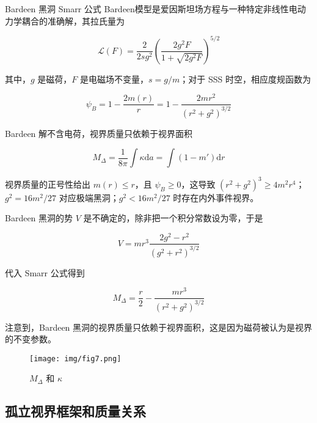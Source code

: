 \documentclass[9pt, dvipsnames]{beamer} %
\begin{document}
\begin{frame}{Bardeen 黑洞 Smarr 公式}
    Bardeen模型是爱因斯坦场方程与一种特定非线性电动力学耦合的准确解，其拉氏量为

    $$
    \mathcal{L}(F)
    =\frac{2 }{2 sg^2 } \left(\frac{2g^2 F }{1+\sqrt{2g^2 F} }  \right)^{5/2}
    $$

    其中，$g$ 是磁荷，$F$ 是电磁场不变量，$s=g/m$；对于 SSS 时空，相应度规函数为

    $$
    \psi_B
    =1-\frac{2 m(r) }{r } 
    =1-\frac{2mr^2 }{\left(r^2+g^2 \right)^{3/2} }
    $$

    Bardeen 解不含电荷，视界质量只依赖于视界面积

    $$
    M_\Delta
    =\frac{1 }{8\pi } \int\kappa \mathrm{d}a
    =\int \left(1-m' \right)\mathrm{d}r
    $$

    视界质量的正号性给出 $m(r)\leqslant r$，且 $\psi_B\geqslant 0$，这导致 $(r^2+g^2)^3\geqslant 4m^2 r^4$；$g^2=16m^2/27$ 对应极端黑洞；$g^2<16m^2/27$ 时存在内外事件视界。
\end{frame}

\begin{frame}
    Bardeen 黑洞的势 $V$ 是不确定的，除非把一个积分常数设为零，于是
    
    $$
    V = m r^3 \frac{2g^2 - r^2 }{\left(g^2 + r^2 \right)^{3/2} }
    $$

    代入 Smarr 公式得到

    $$
    M_\Delta = \frac{r }{2 } - \frac{m r^3 }{\left(r^2+g^2 \right)^{3/2} } 
    $$

    注意到，Bardeen 黑洞的视界质量只依赖于视界面积，这是因为磁荷被认为是视界的不变参数。
    \begin{figure}
        \centering
        \texttt{[image: img/fig7.png]}
        \caption{$M_\Delta$ 和 $\kappa$}
      \end{figure}
\end{frame}

\subsection{孤立视界框架和质量关系}
\end{document}
